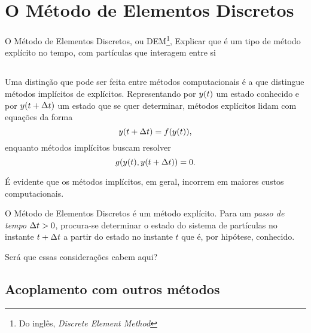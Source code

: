 \chapter{O Método de Elementos Discretos} \label{ch:discrete_element_method}

O Método de Elementos Discretos, ou DEM\footnote{Do inglês, \textit{Discrete Element Method}}, \alert{Explicar que é um tipo de método explícito no tempo, com partículas que interagem entre si}

\section{}

Uma distinção que pode ser feita entre métodos computacionais é a que distingue métodos implícitos de explícitos. Representando por \(y\pqty{t}\) um estado conhecido e por \(y\pqty{t+\Dt}\) um estado que se quer determinar, métodos explícitos lidam com equações da forma
\[
	y\pqty{t+\Dt} = f\pqty{y\pqty{t}},
\]
enquanto métodos implícitos buscam resolver
\[
	g\pqty{y\pqty{t}, y\pqty{t+\Dt}} = 0.
\]

É evidente que os métodos implícitos, em geral, incorrem em maiores custos computacionais. 

O Método de Elementos Discretos é um método explícito. Para um \textit{passo de tempo} \(\Delta t>0\), procura-se determinar o estado do sistema de partículas no instante \(t+\Delta t\) a partir do estado no instante \(t\) que é, por hipótese, conhecido.

\alert{Será que essas considerações cabem aqui?}

\section{Acoplamento com outros métodos}